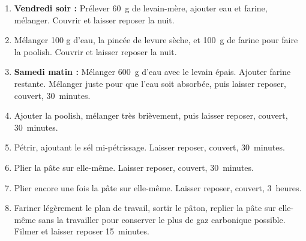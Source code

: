 
\begin{ingredients}
\end{ingredients}



\begin{recipe}
  \begin{enumerate}

  \item \textbf{Vendredi soir : } Prélever 60~g de levain-mère, ajouter
    eau et farine, mélanger.  Couvrir et laisser reposer la nuit.
    
  \item Mélanger 100 g d'eau, la pincée de levure sèche, et 100~g de
    farine pour faire la poolish.  Couvrir et laisser reposer la nuit.
    
  \item \textbf{Samedi matin : } Mélanger 600~g d'eau avec le levain
    épais.  Ajouter farine restante.  Mélanger juste pour que l'eau
    soit absorbée, puis laisser reposer, couvert, 30~minutes.
    
  \item Ajouter la poolish, mélanger très brièvement, puis laisser
    reposer, couvert, 30~minutes.
    
  \item Pétrir, ajoutant le sél mi-pétrissage.  Laisser reposer,
    couvert, 30~minutes.
    
  \item Plier la pâte sur elle-même.  Laisser reposer, couvert,
    30~minutes.
    
  \item Plier encore une fois la pâte sur elle-même.  Laisser reposer,
    couvert, 3~heures.
    
  \item Fariner légèrement le plan de travail, sortir le pâton,
    replier la pâte sur elle-même sans la travailler pour conserver le
    plus de gaz carbonique possible.  Filmer et laisser reposer
    15~minutes.
    

\end{enumerate}
\end{recipe}
